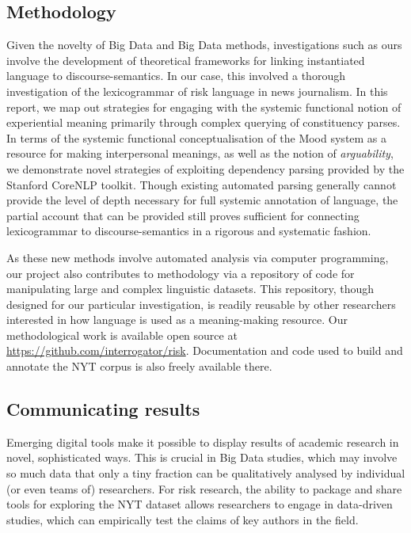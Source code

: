 \subsection{Methodology}

Given the novelty of Big Data and Big Data methods, investigations such as ours involve the development of theoretical frameworks for linking instantiated language to discourse-semantics. In our case, this involved a thorough investigation of the lexicogrammar of risk language in news journalism. In this report, we map out strategies for engaging with the systemic functional notion of experiential meaning primarily through complex querying of constituency parses. In terms of the systemic functional conceptualisation of the Mood system as a resource for making interpersonal meanings, as well as the notion of \emph{arguability}, we demonstrate novel strategies of exploiting dependency parsing provided by the Stanford CoreNLP toolkit. Though existing automated parsing generally cannot provide the level of depth necessary for full systemic annotation of language, the partial account that can be provided still proves sufficient for connecting lexicogrammar to discourse-semantics in a rigorous and systematic fashion.

As these new methods involve automated analysis via computer programming, our project also contributes to methodology via a repository of code for manipulating large and complex linguistic datasets. This repository, though designed for our particular investigation, is readily reusable by other researchers interested in how language is used as a meaning-making resource. Our methodological work is available open source at \url{https://github.com/interrogator/risk}. Documentation and code used to build and annotate the NYT corpus is also freely available there.

\subsection{Communicating results}

Emerging digital tools make it possible to display results of academic research in novel, sophisticated ways. This is crucial in Big Data studies, which may involve so much data that only a tiny fraction can be qualitatively analysed by individual (or even teams of) researchers. For risk research, the ability to package and share tools for exploring the NYT dataset allows researchers to engage in data-driven studies, which can empirically test the claims of key authors in the field.

